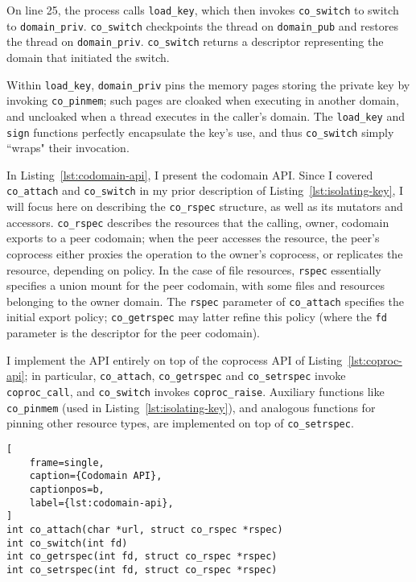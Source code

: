 On line 25, the process calls \texttt{load\_key}, which then invokes
\texttt{co\_switch} to switch to \texttt{domain\_priv}.
%
\texttt{co\_switch} checkpoints the thread on \texttt{domain\_pub} and restores
the thread on \texttt{domain\_priv}.
%
\texttt{co\_switch} returns a descriptor representing the domain that
initiated the switch.


Within \texttt{load\_key}, \texttt{domain\_priv} pins the memory pages storing
the private key by invoking \texttt{co\_pinmem};
such pages are cloaked when executing in another
domain, and uncloaked when a thread executes in the caller's domain.
%
The \texttt{load\_key} and \texttt{sign}
functions perfectly encapsulate the key's use, and thus  \texttt{co\_switch}
simply ``wraps" their invocation.


%
In Listing~\ref{lst:codomain-api}, I present the codomain API\@.
%
Since I covered \texttt{co\_attach} and \texttt{co\_switch} in my prior
description of Listing~\ref{lst:isolating-key}, I will focus here on describing
the \texttt{co\_rspec} structure, as well as its mutators and accessors.
%
\texttt{co\_rspec} describes the resources that the calling, owner, codomain
exports to a peer codomain; when the peer accesses the resource, the peer's
coprocess either proxies the operation to the owner's coprocess, or replicates
the resource, depending on policy.
%
In the case of file resources, \texttt{rspec} essentially specifies a union
mount for the peer codomain, with some files and resources belonging to the
owner domain.
%
The \texttt{rspec} parameter of \texttt{co\_attach} specifies the initial
export policy; \texttt{co\_getrspec} may latter refine this policy (where
the \texttt{fd} parameter is the descriptor for the peer codomain).


I implement the API entirely on top of the coprocess API of
Listing~\ref{lst:coproc-api}; in particular, \texttt{co\_attach},
\texttt{co\_getrspec} and \texttt{co\_setrspec} invoke \texttt{coproc\_call},
and \texttt{co\_switch} invokes \texttt{coproc\_raise}.
%
Auxiliary functions like \texttt{co\_pinmem} (used in
Listing~\ref{lst:isolating-key}), and analogous functions for pinning other
resource types, are implemented on top of \texttt{co\_setrspec}.

\begin{lstlisting}[
    frame=single,
    caption={Codomain API},
    captionpos=b,
    label={lst:codomain-api},
]
int co_attach(char *url, struct co_rspec *rspec)
int co_switch(int fd)
int co_getrspec(int fd, struct co_rspec *rspec)
int co_setrspec(int fd, struct co_rspec *rspec)
\end{lstlisting}

